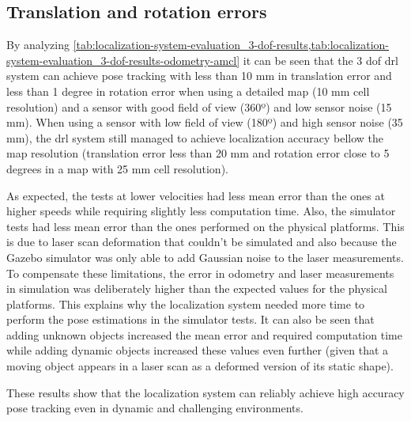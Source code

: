 \subsection{Translation and rotation errors}

By analyzing \cref{tab:localization-system-evaluation_3-dof-results,tab:localization-system-evaluation_3-dof-results-odometry-amcl} it can be seen that the 3 \gls{dof} \gls{drl} system can achieve pose tracking with less than 10 mm in translation error and less than 1 degree in rotation error when using a detailed map (10 mm cell resolution) and a sensor with good field of view (360º) and low sensor noise (15 mm). When using a sensor with low field of view (180º) and high sensor noise (35 mm), the \gls{drl} system still managed to achieve localization accuracy bellow the map resolution (translation error less than 20 mm and rotation error close to 5 degrees in a map with 25 mm cell resolution).

As expected, the tests at lower velocities had less mean error than the ones at higher speeds while requiring slightly less computation time. Also, the simulator tests had less mean error than the ones performed on the physical platforms. This is due to laser scan deformation that couldn't be simulated and also because the Gazebo simulator was only able to add Gaussian noise to the laser measurements. To compensate these limitations, the error in odometry and laser measurements in simulation was deliberately higher than the expected values for the physical platforms. This explains why the localization system needed more time to perform the pose estimations in the simulator tests. It can also be seen that adding unknown objects increased the mean error and required computation time while adding dynamic objects increased these values even further (given that a moving object appears in a laser scan as a deformed version of its static shape).

These results show that the localization system can reliably achieve high accuracy pose tracking even in dynamic and challenging environments.

